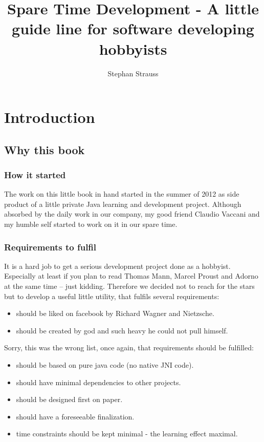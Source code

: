 \documentclass[a4paper]{book}
\author{Stephan Strauss}
\begin{document}
    \title{Spare Time Development - A little guide line for software developing hobbyists}
    \maketitle
    
\part{Introduction}

\chapter{Why this book}

\section{How it started}


The work on this little book in hand started in the summer of 2012 as side product of a little private Java learning and development project. Although absorbed by the daily work in our company, my good friend Claudio Vaccani and my humble self started to work on it in our spare time. 

\section[Requirements]{Requirements to fulfil}

It is a hard job to get a serious development project done as a hobbyist. Especially at least if you plan to read Thomas Mann, Marcel Proust and Adorno at the same time -- just kidding. Therefore we decided not to reach for the stars but to develop a useful little utility, that fulfils several requirements:


\begin{itemize}
\item should be liked on facebook by Richard Wagner and Nietzsche.
\item should be created by god and such heavy he could not pull himself. 
\end{itemize}
Sorry, this was the wrong list, once again, that requirements should be fulfilled:


\begin{itemize}
\item should be based on pure java code (no native JNI code).
\item should have minimal dependencies to other projects. 
\item should be designed first on paper. 
\item should have a foreseeable finalization.
\item time constraints should be kept minimal - the learning effect maximal. 
\end{itemize}
\end{document}
